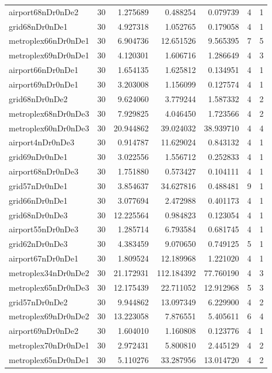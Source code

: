 \begin{longtable}{|l|r|r|r|r|r|r|}
airport68nDr0nDe2 & 30 & 1.275689 & 0.488254 & 0.079739 & 4 & 1 \\
grid68nDr0nDe1 & 30 & 4.927318 & 1.052765 & 0.179058 & 4 & 1 \\
metroplex66nDr0nDe1 & 30 & 6.904736 & 12.651526 & 9.565395 & 7 & 5 \\
metroplex69nDr0nDe1 & 30 & 4.120301 & 1.606716 & 1.286649 & 4 & 3 \\
airport66nDr0nDe1 & 30 & 1.654135 & 1.625812 & 0.134951 & 4 & 1 \\
airport69nDr0nDe1 & 30 & 3.203008 & 1.156099 & 0.127574 & 4 & 1 \\
grid68nDr0nDe2 & 30 & 9.624060 & 3.779244 & 1.587332 & 4 & 2 \\
metroplex68nDr0nDe3 & 30 & 7.929825 & 4.046450 & 1.723566 & 4 & 2 \\
metroplex60nDr0nDe3 & 30 & 20.944862 & 39.024032 & 38.939710 & 4 & 4 \\
airport4nDr0nDe3 & 30 & 0.914787 & 11.629024 & 0.843132 & 4 & 1 \\
grid69nDr0nDe1 & 30 & 3.022556 & 1.556712 & 0.252833 & 4 & 1 \\
airport68nDr0nDe3 & 30 & 1.751880 & 0.573427 & 0.104111 & 4 & 1 \\
grid57nDr0nDe1 & 30 & 3.854637 & 34.627816 & 0.488481 & 9 & 1 \\
grid66nDr0nDe1 & 30 & 3.077694 & 2.472988 & 0.401173 & 4 & 1 \\
grid68nDr0nDe3 & 30 & 12.225564 & 0.984823 & 0.123054 & 4 & 1 \\
airport55nDr0nDe3 & 30 & 1.285714 & 6.793584 & 0.681745 & 4 & 1 \\
grid62nDr0nDe3 & 30 & 4.383459 & 9.070650 & 0.749125 & 5 & 1 \\
airport67nDr0nDe1 & 30 & 1.809524 & 12.189968 & 1.221020 & 4 & 1 \\
metroplex34nDr0nDe2 & 30 & 21.172931 & 112.184392 & 77.760190 & 4 & 3 \\
metroplex65nDr0nDe3 & 30 & 12.175439 & 22.711052 & 12.912968 & 5 & 3 \\
grid57nDr0nDe2 & 30 & 9.944862 & 13.097349 & 6.229900 & 4 & 2 \\
metroplex69nDr0nDe2 & 30 & 13.223058 & 7.876551 & 5.405611 & 6 & 4 \\
airport69nDr0nDe2 & 30 & 1.604010 & 1.160808 & 0.123776 & 4 & 1 \\
metroplex70nDr0nDe1 & 30 & 2.972431 & 5.800810 & 2.445129 & 4 & 2 \\
metroplex65nDr0nDe1 & 30 & 5.110276 & 33.287956 & 13.014720 & 4 & 2 \\

\end{longtable}
